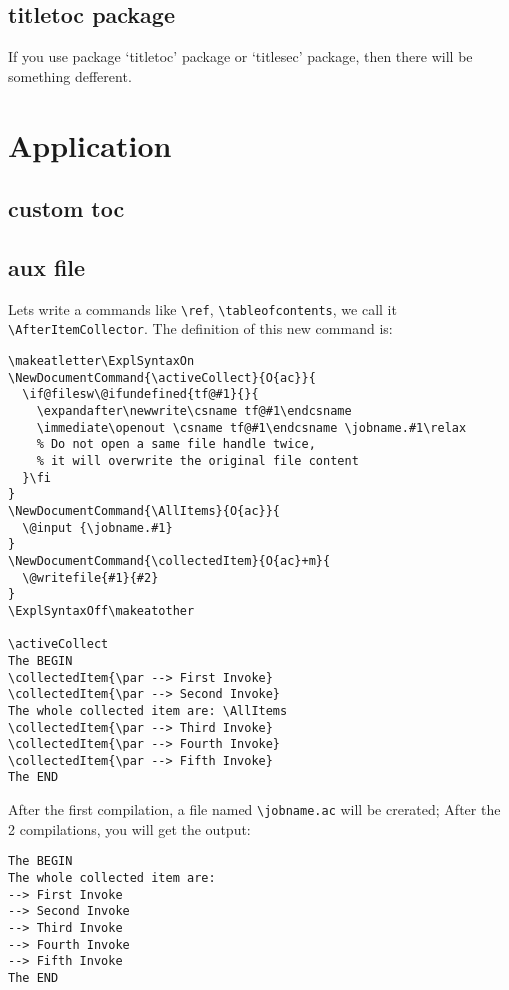 \documentclass{article}
\begin{document}
\subsection{titletoc package}
If you use package `titletoc' package or `titlesec' package, then there will be something defferent.


\section{Application}
\subsection{custom toc}


\subsection{aux file}
Lets write a commands like \verb|\ref|, \verb|\tableofcontents|, we call it \verb|\AfterItemCollector|. The definition 
of this new command is:
\begin{lstlisting}
\makeatletter\ExplSyntaxOn
\NewDocumentCommand{\activeCollect}{O{ac}}{
  \if@filesw\@ifundefined{tf@#1}{}{
    \expandafter\newwrite\csname tf@#1\endcsname
    \immediate\openout \csname tf@#1\endcsname \jobname.#1\relax
    % Do not open a same file handle twice, 
    % it will overwrite the original file content
  }\fi
}
\NewDocumentCommand{\AllItems}{O{ac}}{
  \@input {\jobname.#1}
}
\NewDocumentCommand{\collectedItem}{O{ac}+m}{
  \@writefile{#1}{#2}
}
\ExplSyntaxOff\makeatother

\activeCollect
The BEGIN
\collectedItem{\par --> First Invoke}
\collectedItem{\par --> Second Invoke}
The whole collected item are: \AllItems
\collectedItem{\par --> Third Invoke}
\collectedItem{\par --> Fourth Invoke}
\collectedItem{\par --> Fifth Invoke}
The END
\end{lstlisting}

After the first compilation, a file named \verb|\jobname.ac| will be crerated; After the 2 compilations, 
you will get the output: 
\begin{lstlisting}
The BEGIN
The whole collected item are:
--> First Invoke
--> Second Invoke
--> Third Invoke
--> Fourth Invoke
--> Fifth Invoke
The END
\end{lstlisting}
\end{document}
